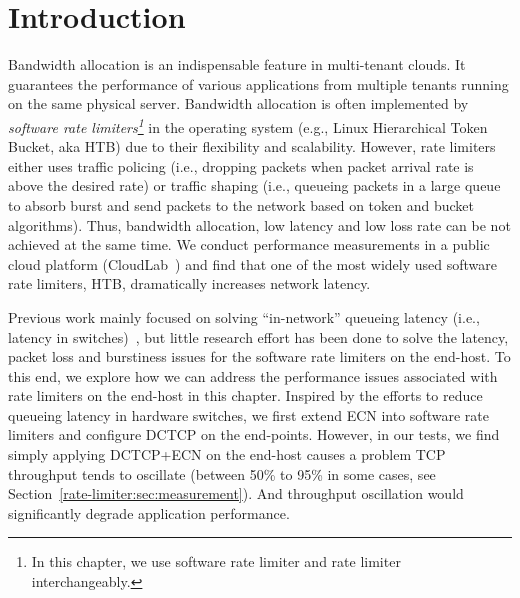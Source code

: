 \section{Introduction}
\label{rate-limiter:sec:introduction}

Bandwidth allocation is an indispensable feature in multi-tenant clouds. 
It guarantees the performance of various applications from multiple tenants running on the same physical server. 
Bandwidth allocation is often implemented by \textit{software rate limiters\footnote{In this chapter,
we use software rate limiter and rate limiter interchangeably.}} 
in the operating system (e.g., Linux Hierarchical Token Bucket, aka HTB) due to their flexibility and scalability.
However, rate limiters either uses traffic policing (i.e., dropping packets when
packet arrival rate is above the desired rate) or traffic shaping (i.e., queueing packets in a large
queue to absorb burst and send packets to the network based on token and bucket algorithms).
Thus, bandwidth allocation, low latency and low loss rate can be not achieved at the same time. 
We conduct performance measurements in a public cloud platform (CloudLab~\cite{cloudlab}) and 
find that one of the most widely used software rate limiters, HTB, dramatically increases network latency.

Previous work mainly focused on solving ``in-network'' queueing latency (i.e., latency in 
switches)~\cite{dctcp,he2016ac,mittal2015timely}, but little research effort has been
done to solve the latency, packet loss and burstiness issues for the software rate limiters on the end-host.
To this end, we explore how we can address the performance issues associated with rate limiters on the end-host in this chapter.
Inspired by the efforts to reduce queueing latency in hardware switches, 
we first extend ECN into software rate limiters and configure DCTCP on the end-points. 
However, in our tests, we find simply applying DCTCP+ECN on the end-host causes a problem \textemdash\xspace 
TCP throughput tends to oscillate (between 50\% to 95\% in some cases, see Section~\ref{rate-limiter:sec:measurement}). 
And throughput oscillation would significantly degrade application performance. 

